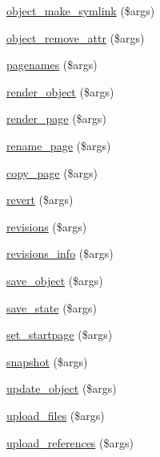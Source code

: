\begin{DoxyCompactItemize}
\hyperlink{module__glue_8inc_8php_a14e6da411df5aa9ff38e2d4ea27dd077}{object\_\-make\_\-symlink} (\$args)
\item 
\hyperlink{module__glue_8inc_8php_ae16d748c2d933978daec8bf11acdc34b}{object\_\-remove\_\-attr} (\$args)
\item 
\hyperlink{module__glue_8inc_8php_a354fc85f928484ae3b316bbf0065d9bd}{pagenames} (\$args)
\item 
\hyperlink{module__glue_8inc_8php_ae9103a74e4b40e88536fbc0a52d1c72f}{render\_\-object} (\$args)
\item 
\hyperlink{module__glue_8inc_8php_aab1981a767de519c6c4afb946d748d0a}{render\_\-page} (\$args)
\item 
\hyperlink{module__glue_8inc_8php_acd08b36587528b6f088cafb7d1d6bd29}{rename\_\-page} (\$args)
\item 
\hyperlink{module__glue_8inc_8php_a9260da20bb88d89a3beebd98b9194441}{copy\_\-page} (\$args)
\item 
\hyperlink{module__glue_8inc_8php_ae69e25beb40feedc02d3b850587d20cc}{revert} (\$args)
\item 
\hyperlink{module__glue_8inc_8php_a27d90d2ed1b4142554bc4e0e47e9ba0c}{revisions} (\$args)
\item 
\hyperlink{module__glue_8inc_8php_a1dc65b69a920ac4ebc8f7c1df305060b}{revisions\_\-info} (\$args)
\item 
\hyperlink{module__glue_8inc_8php_ab294f21c7f6fed0932b65167f180c78c}{save\_\-object} (\$args)
\item 
\hyperlink{module__glue_8inc_8php_a60d03d7a0d8783e926835f0aa6cff698}{save\_\-state} (\$args)
\item 
\hyperlink{module__glue_8inc_8php_aafa7a8fa046ff6119cb7506d68edf787}{set\_\-startpage} (\$args)
\item 
\hyperlink{module__glue_8inc_8php_a5d3ad02088eee566589cd47fe0dc889a}{snapshot} (\$args)
\item 
\hyperlink{module__glue_8inc_8php_a4aed316adcde13b40c9fc1b35e6537a4}{update\_\-object} (\$args)
\item 
\hyperlink{module__glue_8inc_8php_a43746135e67f614d79317029aced064b}{upload\_\-files} (\$args)
\item 
\hyperlink{module__glue_8inc_8php_a2099347b9bdf5a5973a13e5f7a4be933}{upload\_\-references} (\$args)
\end{DoxyCompactItemize}


